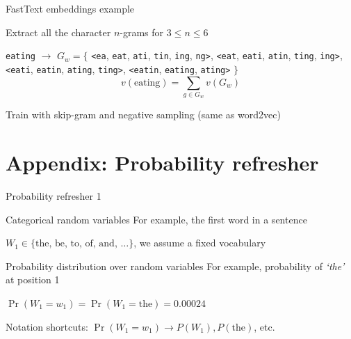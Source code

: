 \documentclass[12pt,aspectratio=169,handout]{beamer}
\begin{document}
\begin{frame}{FastText embeddings example}
	
Extract all the character $n$-grams for $3 \leq n \leq 6$

\begin{example}
\texttt{eating} $\to$ $G_w = \{$
\texttt{<ea}, \texttt{eat}, \texttt{ati}, \texttt{tin}, \texttt{ing}, \texttt{ng>},
\texttt{<eat}, \texttt{eati}, \texttt{atin}, \texttt{ting}, \texttt{ing>},
\texttt{<eati}, \texttt{eatin}, \texttt{ating}, \texttt{ting>},
\texttt{<eatin}, \texttt{eating}, \texttt{ating>} $\}$
$$
v(\text{eating}) = \sum_{g \in G_w} v(G_w)
$$
\end{example}

Train with skip-gram and negative sampling (same as word2vec)



\end{frame}

	



\section{Appendix: Probability refresher}


\begin{frame}{Probability refresher 1}
	
	\begin{block}{Categorical random variables}
		For example, the first word in a sentence
		
		$W_1 \in \{ \textrm{the, be, to, of, and, } \ldots \}$, we assume a fixed vocabulary
	\end{block}
	
	\pause
	
	\begin{block}{Probability distribution over random variables}
		For example, probability of \emph{`the'} at position 1
		
		$\Pr(W_1 = w_1) = \Pr(W_1 = \text{the}) = 0.00024$
		
		\pause
		
		Notation shortcuts: $\Pr(W_1 = w_1) \to P(W_1), P(\text{the})$, etc.
	\end{block}
	
\end{frame}
\end{document}
